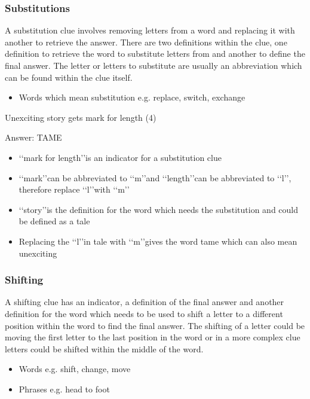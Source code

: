 \subsubsection{Substitutions}

A substitution clue involves removing letters from a word and replacing it with another to retrieve the answer. There are two definitions within the clue, one definition to retrieve the word to substitute letters from and another to define the final answer. The letter or letters to substitute are usually an abbreviation which can be found within the clue itself. 

\begin{itemize} 
	\item Words which mean substitution e.g. replace, switch, exchange
\end{itemize}


Unexciting story gets mark for length (4) 

Answer: TAME 

\begin{itemize}
	\item \lq\lq mark for length\rq\rq is an indicator for a substitution clue  
	\item \lq\lq mark\rq\rq can be abbreviated to \lq\lq m\rq\rq and \lq\lq length\rq\rq can be abbreviated to \lq\lq l\rq\rq, therefore replace \lq\lq l\rq\rq with \lq\lq m\rq\rq 
	\item \lq\lq story\rq\rq is the definition for the word which needs the substitution and could be defined as a tale 
	\item Replacing the \lq\lq l\rq\rq in tale with \lq\lq m\rq\rq gives the word tame which can also mean unexciting 
\end{itemize}

\subsubsection{Shifting}

A shifting clue has an indicator, a definition of the final answer and another definition for the word which needs to be used to shift a letter to a different position within the word to find the final answer. The shifting of a letter could be moving the first letter to the last position in the word or in a more complex clue letters could be shifted within the middle of the word.  

\begin{itemize} 
	\item Words e.g. shift, change, move 
	\item Phrases e.g. head to foot 
\end{itemize}

